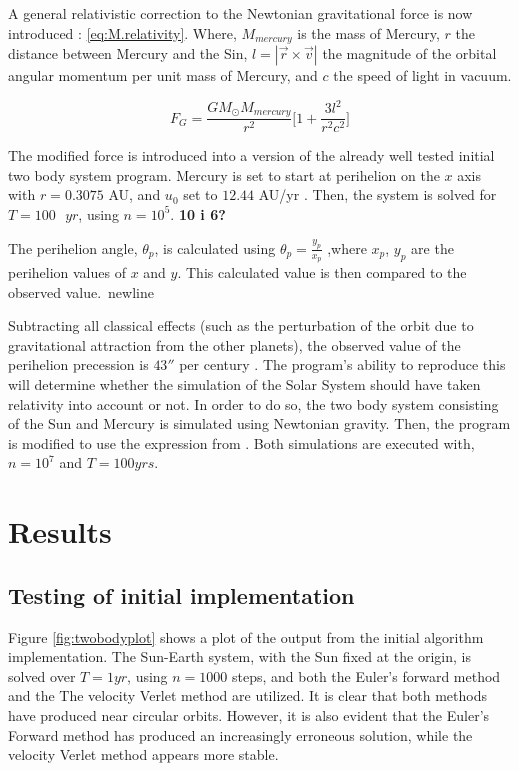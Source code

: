 \documentclass[%
oneside,                 %
final,                   %
10pt]{article}
\begin{document}
A general relativistic correction to the Newtonian gravitational force is now introduced \cite{HJ-expaper}: \eqref{eq:M.relativity}. Where, $M_{mercury}$ is the mass of Mercury, $r$ the distance between Mercury and the Sin, $l=|\vec{r}\times \vec{v}|$ the magnitude of the orbital angular momentum per unit mass of Mercury, and $c$ the speed of light in vacuum. 

\begin{equation}
F_G=\frac{GM_{\odot}M_{mercury}}{r^2}\Big[1+\frac{3l^2}{r^2c^2}\Big]
\label{eq:M.relativity}
\end{equation}

The modified force is introduced into a version of the already well tested initial two body system program. Mercury is set to start at perihelion on the $x$ axis with $r=0.3075$ AU, and $u_0$ set to $12.44$ AU/yr \cite{HJ-expaper}. Then, the system is solved for $T=100 \text{ }yr$, using $n=10^5$. \textbf{10 i 6?} \newline

The perihelion angle, $\theta_p$, is calculated using $\theta_p=\frac{y_p}{x_p}$ ,where $x_p$, $y_p$ are the perihelion values of $x$ and $y$. This calculated value is then compared to the observed value.\ newline

Subtracting all classical effects (such as the perturbation of the orbit due
to gravitational attraction from the other planets), the observed value of the perihelion
precession is $43''$ per century \cite{HJ-expaper}. The program's ability to reproduce this will determine whether the simulation of the Solar System should have taken relativity into account or not. In order to do so, the two body system consisting of the Sun and Mercury is simulated using Newtonian gravity. Then, the program is modified to use the expression from \label{eq:M.relativity}. Both simulations are executed with, $n=10^7$ and $T=100yrs$.



\section{Results}
\subsection{Testing of initial implementation}
Figure \ref{fig:twobodyplot} shows a plot of the output from the initial algorithm implementation. The Sun-Earth system, with the Sun fixed at the origin, is solved over $T=1 yr$, using $n=1000$ steps, and both the Euler's forward method and the The velocity Verlet method are utilized. It is clear that both methods have produced near circular orbits. However, it is also evident that the Euler's Forward method has produced an increasingly erroneous solution, while the velocity Verlet method appears more stable. \newline
\end{document}
